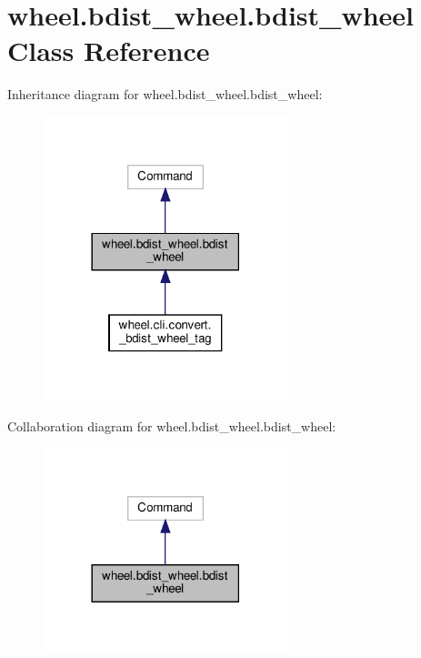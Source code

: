 \hypertarget{classwheel_1_1bdist__wheel_1_1bdist__wheel}{}\section{wheel.\+bdist\+\_\+wheel.\+bdist\+\_\+wheel Class Reference}
\label{classwheel_1_1bdist__wheel_1_1bdist__wheel}


Inheritance diagram for wheel.\+bdist\+\_\+wheel.\+bdist\+\_\+wheel\+:
\nopagebreak
\begin{figure}[H]
\begin{center}
\leavevmode
\includegraphics[width=201pt]{classwheel_1_1bdist__wheel_1_1bdist__wheel__inherit__graph}
\end{center}
\end{figure}


Collaboration diagram for wheel.\+bdist\+\_\+wheel.\+bdist\+\_\+wheel\+:
\nopagebreak
\begin{figure}[H]
\begin{center}
\leavevmode
\includegraphics[width=201pt]{classwheel_1_1bdist__wheel_1_1bdist__wheel__coll__graph}
\end{center}
\end{figure}
